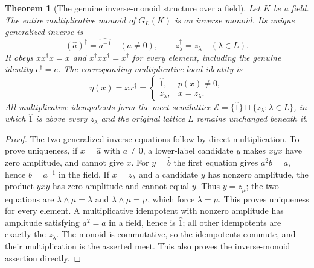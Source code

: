\documentclass[11pt,a4paper]{article}
\newtheorem{theorem}{Theorem}[section]
\theoremstyle{definition}\newtheorem{definition}[theorem]{Definition}
\begin{document}
\begin{theorem}[The genuine inverse-monoid structure over a field]
\label{sh:inversemonoid}
Let $K$ be a field. The entire multiplicative monoid of $G_L(K)$
is an inverse monoid. Its unique generalized inverse is
\begin{equation}\tag{SH6a}\label{sh:generalizedinverse}
 (\widehat a)^\dagger=\widehat{a^{-1}}\quad(a\ne0),\qquad
 z_\lambda^\dagger=z_\lambda\quad(\lambda\in L).
\end{equation}
It obeys $xx^\dagger x=x$ and
$x^\dagger xx^\dagger=x^\dagger$ for every element,
including the genuine identity $e^\dagger=e$.
The corresponding multiplicative local identity is
\begin{equation}\tag{SH6b}\label{sh:rangeidempotent}
 \eta(x)=xx^\dagger=
 \begin{cases}
 \widehat1,&p(x)\ne0,\\
 z_\lambda,&x=z_\lambda.
 \end{cases}
\end{equation}
All multiplicative idempotents form the meet-semilattice
$\mathcal E=\{\widehat1\}\sqcup\{z_\lambda:\lambda\in L\}$,
in which $\widehat1$ is above every $z_\lambda$ and the
original lattice $L$ remains unchanged beneath it.
\end{theorem}
\begin{proof}
The two generalized-inverse equations follow by direct
multiplication. To prove uniqueness, if $x=\widehat a$ with
$a\ne0$, a lower-label candidate $y$ makes $xyx$ have zero
amplitude, and cannot give $x$. For $y=\widehat b$ the first
equation gives $a^2b=a$, hence $b=a^{-1}$ in the field.
If $x=z_\lambda$ and a candidate $y$ has nonzero amplitude,
the product $yxy$ has zero amplitude and cannot equal $y$.
Thus $y=z_\mu$; the two equations are
$\lambda\wedge\mu=\lambda$ and
$\lambda\wedge\mu=\mu$, which force $\lambda=\mu$.
This proves uniqueness for every element. A multiplicative
idempotent with nonzero amplitude has amplitude satisfying
$a^2=a$ in a field, hence is $\widehat1$; all other
idempotents are exactly the $z_\lambda$.
The monoid is commutative, so the idempotents commute, and
their multiplication is the asserted meet. This also proves
the inverse-monoid assertion directly.
\end{proof}
\end{document}

